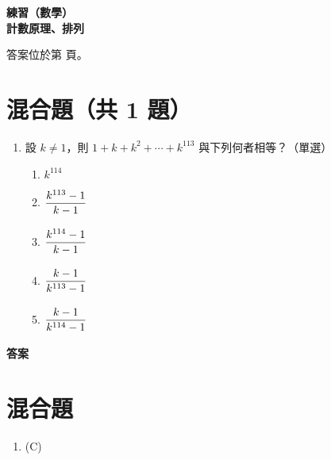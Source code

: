 \documentclass[10pt]{article}
\newcommand*{\fraction}[2]{\rule[-.8\baselineskip]{0pt}{2\baselineskip}\dfrac{#1}{#2}}
\renewcommand*{\maketitle}{{%
  \bfseries
  \LARGE 練習（數學） \\
  \large 計數原理、排列 \par
}}
\begin{document}
\maketitle
\medskip
答案位於第 \pageref{answer} 頁。
\section{混合題（共 1 題）}
\begin{enumerate}[label=\arabic*.,align=left,leftmargin=*,labelsep=.3em]
  \item 設 $k \neq 1$，則 $1 + k + k^2 + \cdots + k^{113}$ 與下列何者相等？（單選）
  \begin{enumerate}[label=(\Alph*),align=left,leftmargin=*,labelsep=.3em]
    \item $k^{114}$
    \item $\fraction{k^{113}-1}{k-1}$
    \item $\fraction{k^{114}-1}{k-1}$
    \item $\fraction{k-1}{k^{113}-1}$
    \item $\fraction{k-1}{k^{114}-1}$
  \end{enumerate}
\end{enumerate}

\newpage
\label{answer}
{\bfseries\large 答案 \par}
\setcounter{section}{0}
\section{混合題}
\begin{enumerate}[label=\arabic*.,left=0pt]
  \item (C)
\end{enumerate}
\end{document}
